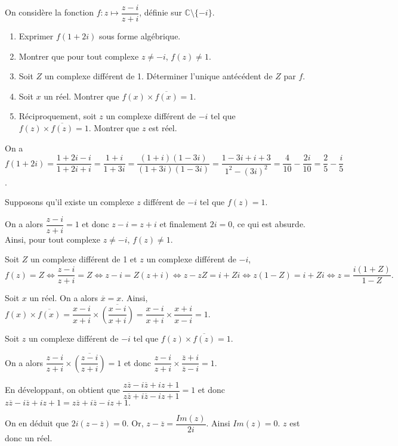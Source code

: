 \documentclass[11pt,fleqn, openany]{book} %
\begin{document}
\begin{exercise}[topic=cpx03]On considère la fonction $f:z\mapsto \dfrac{z-i}{z+i}$, définie sur $\mathbb{C} \setminus \{-i\}$.

\begin{enumerate}
\item Exprimer $f(1+2i)$ sous forme algébrique.
\item Montrer que pour tout complexe $z \neq -i$, $f(z) \neq 1$.
\item Soit $Z$ un complexe différent de 1. Déterminer l'unique antécédent de $Z$ par $f$.
\item Soit $x$ un réel. Montrer que $f(x) \times \overline{f(x)}=1$.
\item Réciproquement, soit $z$ un complexe différent de $-i$ tel que $f(z) \times \overline{f(z)}=1$. Montrer que $z$ est réel.
\end{enumerate}\end{exercise}

\begin{solution}On a \(f(1+2i)=\dfrac{1+2i-i}{1+2i+i}=\dfrac{1+i}{1+3i}=\dfrac{(1+i)(1-3i)}{(1+3i)(1-3i)}=\dfrac{1-3i+i+3}{1^2-(3i)^2}=\dfrac{4}{10}-\dfrac{2i}{10}=\dfrac{2}{5}-\dfrac{i}{5}\).

Supposons qu'il existe un complexe \(z\) différent de \(-i\) tel que \(f(z)=1\).

On a alors  \(\dfrac{z-i}{z+i} = 1\) et donc \(z-i=z+i\) et finalement \(2i=0\), ce qui est absurde. Ainsi, pour tout complexe \(z \neq -i\), \(f(z) \neq 1\).

Soit \(Z\) un complexe différent de 1 et \(z\) un complexe différent de \(-i\),
\[f(z)=Z \Leftrightarrow \dfrac{z-i}{z+i} = Z \Leftrightarrow z-i=Z(z+i)\Leftrightarrow z-zZ=i+Zi \Leftrightarrow z(1-Z)=i+Zi \Leftrightarrow z = \dfrac{i(1+Z)}{1-Z}.\]

Soit \(x\) un réel. On a alors \(\overline{x}=x\). Ainsi, \(f(x) \times \overline{f(x)} = \dfrac{x-i}{x+i} \times \overline{\left(\dfrac{x-i}{x+i}\right)} = \dfrac{x-i}{x+i} \times \dfrac{x+i}{x-i}=1.\)

Soit \(z\) un complexe différent de \(-i\) tel que \(f(z) \times \overline{f(z)}=1\). 

On a alors \(\dfrac{z-i}{z+i} \times \overline{\left(\dfrac{z-i}{z+i}\right)}=1 \) et donc \( \dfrac{z-i}{z+i} \times \dfrac{\overline{z}+i}{\overline{z}-i}=1 \).

En développant, on obtient que \(\dfrac{z\overline{z}-i\overline{z}+iz+1}{z\overline{z}+i\overline{z}-iz+1}=1\) et donc \(z\overline{z}-i\overline{z}+iz+1 = z\overline{z}+i\overline{z}-iz+1.\)

On en déduit que \(2i(z-\overline{z})=0.\) Or, \(z-\overline{z}=\dfrac{Im(z)}{2i}\). Ainsi
\(Im(z)=0.\)
\(z\) est donc un réel.\end{solution}
\end{document}
